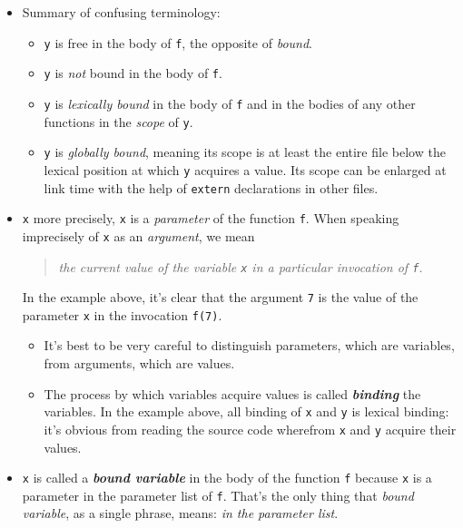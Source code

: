 \documentclass[10pt,oneside,x11names]{article}
\begin{document}
\begin{itemize}
\item Summary of confusing terminology:

\begin{itemize}
\item \texttt{y} is free in the body of \texttt{f}, the opposite of \emph{bound}.

\item \texttt{y} is \emph{not} bound in the body of \texttt{f}.

\item \texttt{y} is \emph{lexically bound} in the body of \texttt{f} and in the
bodies of any other functions in the \emph{scope} of \texttt{y}.

\item \texttt{y} is \emph{globally bound}, meaning its scope is at least the
entire file below the lexical position at which \texttt{y} acquires a
value. Its scope can be enlarged at link time with the help of
\texttt{extern} declarations in other files.
\end{itemize}

\item \texttt{x} more precisely, \texttt{x} is a \emph{parameter} of the function \texttt{f}.
When speaking imprecisely of \texttt{x} as an \emph{argument}, we mean

\begin{quote}
\emph{the  current value of the variable \texttt{x} in a particular invocation of \texttt{f}.}
\end{quote}

In the example above, it's clear that the argument \texttt{7}
is the value of the parameter \texttt{x} in the invocation \texttt{f(7)}.

\begin{itemize}
\item It's best to be very careful to distinguish parameters, which
are variables, from arguments, which are values.

\item The process by which variables acquire values is called
\textbf{\emph{binding}} the variables. In the example above, all binding
of \texttt{x} and \texttt{y} is lexical binding: it's obvious from reading
the source code wherefrom \texttt{x} and \texttt{y} acquire their values.
\end{itemize}

\item \texttt{x} is called a \textbf{\emph{bound variable}} in the body of the function
\texttt{f} because \texttt{x} is a parameter in the parameter list of \texttt{f}.
That's the only thing that \emph{bound variable}, as a single phrase,
means: \emph{in the parameter list}.


\end{itemize}
\end{document}

